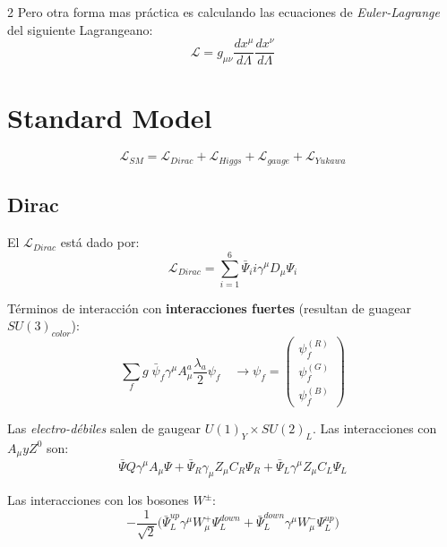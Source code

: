 \documentclass[12pt]{article}
\begin{document}
\begin{multicols}{2}
        Pero otra forma mas práctica es calculando las ecuaciones de \textit{Euler-Lagrange} del siguiente Lagrangeano:
        \begin{equation*}
            \mathcal{L} = g_{\mu\nu} \frac{dx^{\mu}}{d\Lambda} \frac{dx^{\nu}}{d\Lambda}
        \end{equation*}
        
        \section*{Standard Model}
        \begin{equation*}
            \mathcal{L}_{SM} = \mathcal{L}_{Dirac} + \mathcal{L}_{Higgs} + \mathcal{L}_{gauge} + \mathcal{L}_{Yukawa}
        \end{equation*}

        \subsection*{Dirac}
        El $\mathcal{L}_{Dirac}$ está dado por:
        \begin{equation*}
            \mathcal{L}_{Dirac} = \sum_{i=1}^{6} \bar{\Psi}_i i \gamma^{\mu} D_{\mu} \Psi_i
        \end{equation*}

        Términos de interacción con \textbf{interacciones fuertes} (resultan de guagear $SU(3)_{color}$):
        \begin{equation*}
            \sum_{f} g\;\bar{\psi}_{f} \gamma^{\mu} A_{\mu}^a \frac{\lambda_{a}}{2} \psi_f \quad \rightarrow \psi_f = \begin{pmatrix} \psi_{f}^{(R)} \\\psi_{f}^{(G)} \\ \psi_{f}^{(B)} \end{pmatrix}
        \end{equation*}

        Las \textit{electro-débiles} salen de gaugear $U(1)_Y \times SU(2)_L$. Las interacciones con \textbf{$A_{\mu} y Z^{0}$} son:
        \begin{equation*}
            \bar{\Psi}Q\gamma^{\mu}A_{\mu}\Psi + \bar{\Psi}_R \gamma_{\mu}Z_{\mu}C_{R}\Psi_R + \bar{\Psi}_{L}\gamma^{\mu}Z_{\mu}C_{L}\Psi_{L}
        \end{equation*}

        Las interacciones con los bosones $W^{\pm}$:
        \begin{equation*}
            -\frac{1}{\sqrt{2}}\bigg(\bar{\Psi}^{up}_{L} \gamma^{\mu} W_{\mu}^{+} \Psi_{L}^{down} + \bar{\Psi}_{L}^{down}\gamma^{\mu}W_{\mu}^{-}\Psi_{L}^{up}\bigg)
        \end{equation*}


\end{multicols}
\end{document}
